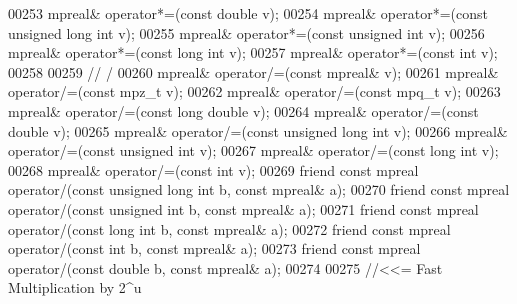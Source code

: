 \begin{DoxyCode}
00253     mpreal& operator*=(\textcolor{keyword}{const} \textcolor{keywordtype}{double} v);
00254     mpreal& operator*=(\textcolor{keyword}{const} \textcolor{keywordtype}{unsigned} \textcolor{keywordtype}{long} \textcolor{keywordtype}{int} v);
00255     mpreal& operator*=(\textcolor{keyword}{const} \textcolor{keywordtype}{unsigned} \textcolor{keywordtype}{int} v);
00256     mpreal& operator*=(\textcolor{keyword}{const} \textcolor{keywordtype}{long} \textcolor{keywordtype}{int} v);
00257     mpreal& operator*=(\textcolor{keyword}{const} \textcolor{keywordtype}{int} v);
00258 
00259     \textcolor{comment}{// /}
00260     mpreal& operator/=(\textcolor{keyword}{const} mpreal& v);
00261     mpreal& operator/=(\textcolor{keyword}{const} mpz\_t v);
00262     mpreal& operator/=(\textcolor{keyword}{const} mpq\_t v);
00263     mpreal& operator/=(\textcolor{keyword}{const} \textcolor{keywordtype}{long} \textcolor{keywordtype}{double} v);
00264     mpreal& operator/=(\textcolor{keyword}{const} \textcolor{keywordtype}{double} v);
00265     mpreal& operator/=(\textcolor{keyword}{const} \textcolor{keywordtype}{unsigned} \textcolor{keywordtype}{long} \textcolor{keywordtype}{int} v);
00266     mpreal& operator/=(\textcolor{keyword}{const} \textcolor{keywordtype}{unsigned} \textcolor{keywordtype}{int} v);
00267     mpreal& operator/=(\textcolor{keyword}{const} \textcolor{keywordtype}{long} \textcolor{keywordtype}{int} v);
00268     mpreal& operator/=(\textcolor{keyword}{const} \textcolor{keywordtype}{int} v);
00269     \textcolor{keyword}{friend} \textcolor{keyword}{const} mpreal operator/(\textcolor{keyword}{const} \textcolor{keywordtype}{unsigned} \textcolor{keywordtype}{long} \textcolor{keywordtype}{int} b, \textcolor{keyword}{const} mpreal& a);
00270     \textcolor{keyword}{friend} \textcolor{keyword}{const} mpreal operator/(\textcolor{keyword}{const} \textcolor{keywordtype}{unsigned} \textcolor{keywordtype}{int} b,      \textcolor{keyword}{const} mpreal& a);
00271     \textcolor{keyword}{friend} \textcolor{keyword}{const} mpreal operator/(\textcolor{keyword}{const} \textcolor{keywordtype}{long} \textcolor{keywordtype}{int} b,          \textcolor{keyword}{const} mpreal& a);
00272     \textcolor{keyword}{friend} \textcolor{keyword}{const} mpreal operator/(\textcolor{keyword}{const} \textcolor{keywordtype}{int} b,               \textcolor{keyword}{const} mpreal& a);
00273     \textcolor{keyword}{friend} \textcolor{keyword}{const} mpreal operator/(\textcolor{keyword}{const} \textcolor{keywordtype}{double} b,            \textcolor{keyword}{const} mpreal& a);
00274 
00275     \textcolor{comment}{//<<= Fast Multiplication by 2^u}

\end{DoxyCode}
